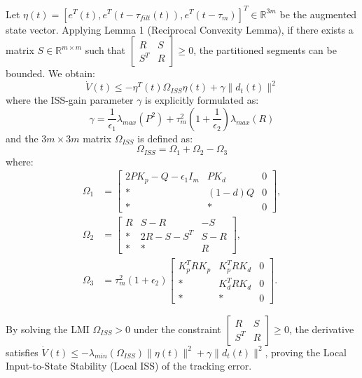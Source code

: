 \documentclass[letterpaper,journal]{IEEEtran}
\begin{document}
Let $\eta(t) = [e^T(t), e^T(t-\tau_{filt}(t)), e^T(t-\tau_m)]^T \in \mathbb{R}^{3m}$ be the augmented state vector. Applying Lemma 1 (Reciprocal Convexity Lemma), if there exists a matrix $S \in \mathbb{R}^{m \times m}$ such that $\begin{bmatrix} R & S \\ S^T & R \end{bmatrix} \ge 0$, the partitioned segments can be bounded. We obtain:
\begin{equation}
\dot{V}(t) \le -\eta^T(t) \Omega_{ISS} \eta(t) + \gamma \|d_t(t)\|^2
\end{equation}
where the ISS-gain parameter $\gamma$ is explicitly formulated as:
\begin{equation}
\gamma = \frac{1}{\epsilon_1}\lambda_{max}(P^2) + \tau_m^2 \left( 1 + \frac{1}{\epsilon_2} \right) \lambda_{max}(R)
\end{equation}
and the $3m \times 3m$ matrix $\Omega_{ISS}$ is defined as:
\begin{equation}
\Omega_{ISS} = \Omega_1 + \Omega_2 - \Omega_3
\end{equation}
where:
\begin{align*}
\Omega_1 &= \begin{bmatrix} 2 P K_p - Q - \epsilon_1 I_m & P K_d & 0 \\ * & (1-d)Q & 0 \\ * & * & 0 \end{bmatrix}, \\
\Omega_2 &= \begin{bmatrix} R & S-R & -S \\ * & 2R-S-S^T & S-R \\ * & * & R \end{bmatrix}, \\
\Omega_3 &= \tau_m^2 (1 + \epsilon_2) \begin{bmatrix} K_p^T R K_p & K_p^T R K_d & 0 \\ * & K_d^T R K_d & 0 \\ * & * & 0 \end{bmatrix}.
\end{align*}

By solving the LMI $\Omega_{ISS} > 0$ under the constraint $\begin{bmatrix} R & S \\ S^T & R \end{bmatrix} \ge 0$, the derivative satisfies $\dot{V}(t) \le -\lambda_{min}(\Omega_{ISS}) \|\eta(t)\|^2 + \gamma \|d_t(t)\|^2$, proving the Local Input-to-State Stability (Local ISS) of the tracking error.
\end{document}
